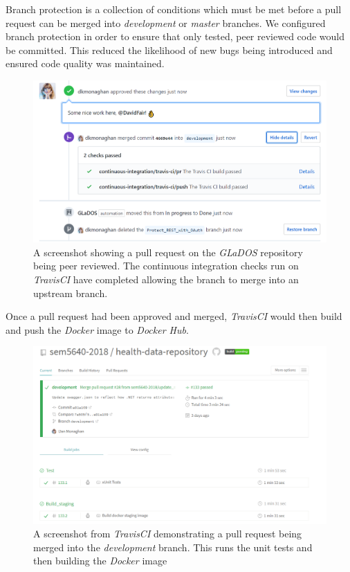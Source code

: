 \par
Branch protection is a collection of conditions which must be met before a pull request can be merged into \textit{development} or \textit{master} branches. We configured branch protection in order to ensure that only tested, peer reviewed code would be committed. This reduced the likelihood of new bugs being introduced and ensured code quality was maintained.

\begin{figure}[H]
    \centering
    \includegraphics[width=\textwidth]{Images/approve_pr.png}
    \caption{A screenshot showing a pull request on the \textit{GLaDOS} repository being peer reviewed. The continuous integration checks run on \textit{TravisCI} have completed allowing the branch to merge into an upstream branch.}
\end{figure}

\par
Once a pull request had been approved and merged, \textit{TravisCI} would then build and push the \textit{Docker} image to \textit{Docker Hub}.

\begin{figure}[H]
    \centering
    \includegraphics[width=\textwidth]{Images/travis_builds_overview.png}
    \caption{A screenshot from \textit{TravisCI} demonstrating a pull request being merged into the \textit{development} branch. This runs the unit tests and then building the \textit{Docker} image}
\end{figure}

